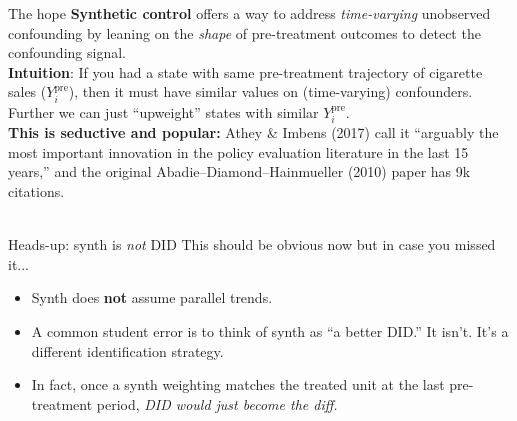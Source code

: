 \documentclass[xcolor=dvipsnames]{beamer}
\newcommand\makegaps{\addtolength{\itemsep}{.25\baselineskip}}
\newcommand{\ypre}{Y^{\text{pre}}_i}      %
\begin{document}
\begin{frame}{The hope}
  \small
\textbf{Synthetic control} offers a way to address \emph{time-varying} unobserved confounding by leaning on the \emph{shape} of pre-treatment outcomes to detect the confounding signal.\\[3ex]
\medskip
{} \textbf{Intuition}: If you had a state with same pre-treatment trajectory of cigarette sales ($\ypre$), then it must have similar values on (time-varying) confounders.  Further we can just ``upweight'' states with similar $\ypre$. \\

\bigskip
{}  \textbf{This is seductive and popular:} Athey \& Imbens (2017) call it ``arguably the most important innovation in the policy evaluation literature in the last 15 years,'' and the original Abadie--Diamond--Hainmueller (2010) paper has 9k citations.\\

\bigskip
{} \\[1ex]

\end{frame}

\begin{frame}{Heads-up: synth is \emph{not} DID}
This should be obvious now but in case you missed it...\\
\begin{itemize}\makegaps
  \item<1-> Synth does \textbf{not} assume parallel trends.
  \item<2-> A common student error is to think of synth as ``a better DID.'' It isn't. It's a different identification strategy.
  \item<3-> In fact, once a synth weighting matches the treated unit at the last pre-treatment period, \emph{DID would just become the diff.}
\end{itemize}
\end{frame}
\end{document}
